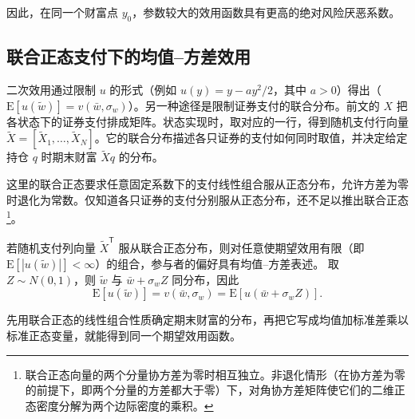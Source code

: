因此，在同一个财富点 $y_0$，参数较大的效用函数具有更高的绝对风险厌恶系数。

\begin{center}
\begin{minipage}{\linewidth}
\centering
\renewcommand{\thewjFigure}{\thechapter.S\arabic{wjFigure}}%
%
\par
{}
\end{minipage}
\end{center}

\subsection{联合正态支付下的均值--方差效用}
二次效用通过限制 $u$ 的形式（例如 $u(y)=y-ay^2/2$，其中 $a>0$）得出（$\mathrm E[u(\widetilde w)]=v(\bar w,\sigma_w)$）。另一种途径是限制证券支付的联合分布。前文的 $X$ 把各状态下的证券支付排成矩阵。状态实现时，取对应的一行，得到随机支付行向量 $\widetilde X=[\widetilde X_1,\ldots,\widetilde X_N]$。它的联合分布描述各只证券的支付如何同时取值，并决定给定持仓 $q$ 时期末财富 $\widetilde Xq$ 的分布。

这里的联合正态要求任意固定系数下的支付线性组合服从正态分布，允许方差为零时退化为常数。仅知道各只证券的支付分别服从正态分布，还不足以推出联合正态\footnote{联合正态向量的两个分量协方差为零时相互独立。非退化情形（在协方差为零的前提下，即两个分量的方差都大于零）下，对角协方差矩阵使它们的二维正态密度分解为两个边际密度的乘积。}。
\begin{tcolorbox}[knowledge]
 若随机支付列向量 $\widetilde X^{\mathsf T}$ 服从联合正态分布，则对任意使期望效用有限（即 $\mathrm E[|u(\widetilde w)|]<\infty$）的组合，参与者的偏好具有均值--方差表述。
取 $Z\sim N(0,1)$，则 $\widetilde w$ 与 $\bar w+\sigma_w Z$ 同分布，因此
\[
 \mathrm E[u(\widetilde w)]
 =v(\bar w,\sigma_w)=\mathrm E[u(\bar w+\sigma_w Z)].
\]
\end{tcolorbox}

先用联合正态的线性组合性质确定期末财富的分布，再把它写成均值加标准差乘以标准正态变量，就能得到同一个期望效用函数。


